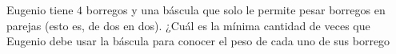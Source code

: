 Eugenio tiene $4$ borregos y una báscula que solo le permite pesar borregos en parejas (esto es, de dos en dos). ¿Cuál es la mínima cantidad de veces que Eugenio debe usar la báscula para conocer el peso de cada uno de sus borrego